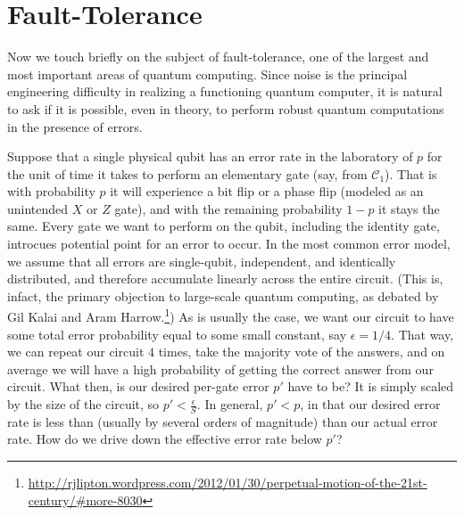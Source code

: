 \section{Fault-Tolerance}
\label{sec:ft}

Now we touch briefly on the subject of fault-tolerance, one of the largest and most
important areas of quantum computing. Since noise is the principal engineering
difficulty in realizing a functioning quantum computer, it is natural to
ask if it is possible, even in theory, to perform robust quantum computations
in the presence of errors.

Suppose that a single physical qubit has an error rate in the laboratory of
$p$ for the unit of time it takes to perform an elementary gate
(say, from $\mathcal{C}_1$). That is with probability $p$
it will experience a bit flip or a phase flip (modeled as an unintended
$X$ or $Z$ gate), and with the remaining probability $1-p$ it stays the same.
Every gate
we want to perform on the qubit, including the identity gate,
introcues potential point for an
error to occur. In the most common error model,
we assume that all errors
are single-qubit, independent, and identically distributed, and therefore accumulate
linearly across the entire
circuit. (This is, infact, the primary objection to large-scale quantum
computing, as debated by Gil Kalai and Aram
Harrow.\footnote{\url{http://rjlipton.wordpress.com/2012/01/30/perpetual-motion-of-the-21st-century/\#more-8030}})
As is usually the case, we want our circuit
to have some total error probability equal to some small constant, say
$\epsilon = 1/4$. That way, we can repeat our circuit $4$ times, take the majority vote
of the answers, and on average we will have a high probability of getting the
correct answer from our circuit. What then, is our desired per-gate error $p'$
have to be? It is simply scaled by the size of the circuit, so
$p' < \frac{\epsilon}{S}$. In general, $p' < p$, in that our desired
error rate is less than (usually by several orders of magnitude) than our
actual error rate. How do we drive down the effective error rate below $p'$?



